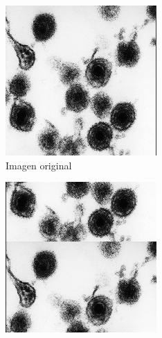 \documentclass{uc3mpracticas}
\begin{document}
  \begin{figure}[!h]
    \centering
    \begin{subfigure}[b]{0.18\textwidth}
      \includegraphics[width=\textwidth, frame]{Images/og.png}
      \caption{Imagen original}
    \end{subfigure}
    \hfill
    \begin{subfigure}[b]{0.18\textwidth}
      \includegraphics[width=\textwidth, frame]{Images/trasAbj.png}

\end{subfigure}
\end{figure}
\end{document}
